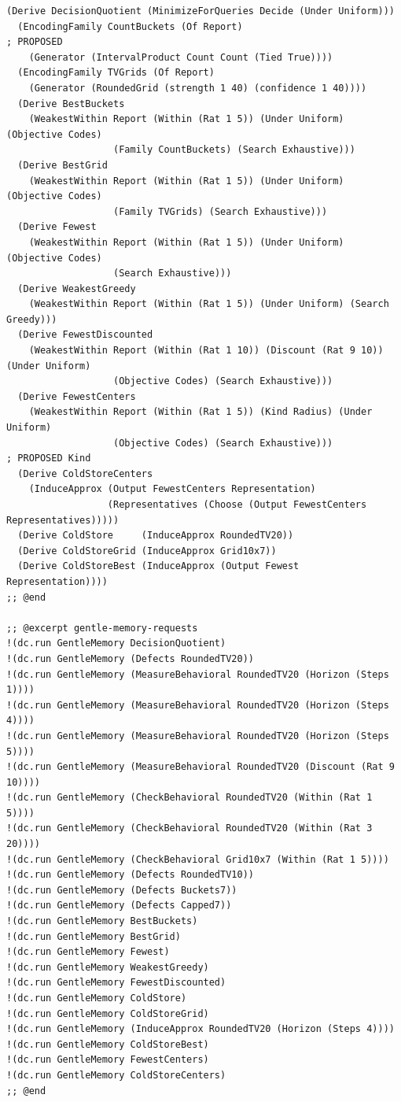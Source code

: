 \documentclass[11pt]{article}
\theoremstyle{definition}
\theoremstyle{plain}
\begin{document}
\begin{lstlisting}[style=mettafull]
  (Derive DecisionQuotient (MinimizeForQueries Decide (Under Uniform)))
  (EncodingFamily CountBuckets (Of Report)                                  ; PROPOSED
    (Generator (IntervalProduct Count Count (Tied True))))
  (EncodingFamily TVGrids (Of Report)
    (Generator (RoundedGrid (strength 1 40) (confidence 1 40))))
  (Derive BestBuckets
    (WeakestWithin Report (Within (Rat 1 5)) (Under Uniform) (Objective Codes)
                   (Family CountBuckets) (Search Exhaustive)))
  (Derive BestGrid
    (WeakestWithin Report (Within (Rat 1 5)) (Under Uniform) (Objective Codes)
                   (Family TVGrids) (Search Exhaustive)))
  (Derive Fewest
    (WeakestWithin Report (Within (Rat 1 5)) (Under Uniform) (Objective Codes)
                   (Search Exhaustive)))
  (Derive WeakestGreedy
    (WeakestWithin Report (Within (Rat 1 5)) (Under Uniform) (Search Greedy)))
  (Derive FewestDiscounted
    (WeakestWithin Report (Within (Rat 1 10)) (Discount (Rat 9 10)) (Under Uniform)
                   (Objective Codes) (Search Exhaustive)))
  (Derive FewestCenters
    (WeakestWithin Report (Within (Rat 1 5)) (Kind Radius) (Under Uniform)
                   (Objective Codes) (Search Exhaustive)))                       ; PROPOSED Kind
  (Derive ColdStoreCenters
    (InduceApprox (Output FewestCenters Representation)
                  (Representatives (Choose (Output FewestCenters Representatives)))))
  (Derive ColdStore     (InduceApprox RoundedTV20))
  (Derive ColdStoreGrid (InduceApprox Grid10x7))
  (Derive ColdStoreBest (InduceApprox (Output Fewest Representation))))
;; @end

;; @excerpt gentle-memory-requests
!(dc.run GentleMemory DecisionQuotient)
!(dc.run GentleMemory (Defects RoundedTV20))
!(dc.run GentleMemory (MeasureBehavioral RoundedTV20 (Horizon (Steps 1))))
!(dc.run GentleMemory (MeasureBehavioral RoundedTV20 (Horizon (Steps 4))))
!(dc.run GentleMemory (MeasureBehavioral RoundedTV20 (Horizon (Steps 5))))
!(dc.run GentleMemory (MeasureBehavioral RoundedTV20 (Discount (Rat 9 10))))
!(dc.run GentleMemory (CheckBehavioral RoundedTV20 (Within (Rat 1 5))))
!(dc.run GentleMemory (CheckBehavioral RoundedTV20 (Within (Rat 3 20))))
!(dc.run GentleMemory (CheckBehavioral Grid10x7 (Within (Rat 1 5))))
!(dc.run GentleMemory (Defects RoundedTV10))
!(dc.run GentleMemory (Defects Buckets7))
!(dc.run GentleMemory (Defects Capped7))
!(dc.run GentleMemory BestBuckets)
!(dc.run GentleMemory BestGrid)
!(dc.run GentleMemory Fewest)
!(dc.run GentleMemory WeakestGreedy)
!(dc.run GentleMemory FewestDiscounted)
!(dc.run GentleMemory ColdStore)
!(dc.run GentleMemory ColdStoreGrid)
!(dc.run GentleMemory (InduceApprox RoundedTV20 (Horizon (Steps 4))))
!(dc.run GentleMemory ColdStoreBest)
!(dc.run GentleMemory FewestCenters)
!(dc.run GentleMemory ColdStoreCenters)
;; @end


\end{lstlisting}
\end{document}
